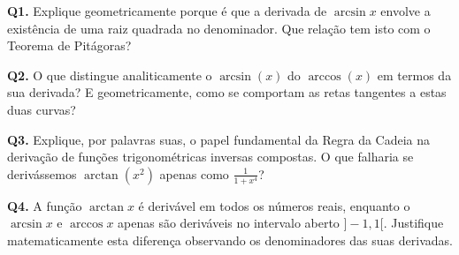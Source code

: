 \begin{oralbox}
  \textbf{Q1.} Explique geometricamente porque é que a derivada de $\arcsin x$ envolve a existência de uma raiz quadrada no denominador. Que relação tem isto com o Teorema de Pitágoras?
\end{oralbox}

\begin{oralbox}
  \textbf{Q2.} O que distingue analiticamente o $\arcsin(x)$ do $\arccos(x)$ em termos da sua derivada? E geometricamente, como se comportam as retas tangentes a estas duas curvas?
\end{oralbox}

\begin{oralbox}
  \textbf{Q3.} Explique, por palavras suas, o papel fundamental da Regra da Cadeia na derivação de funções trigonométricas inversas compostas. O que falharia se derivássemos $\arctan(x^2)$ apenas como $\frac{1}{1+x^4}$?
\end{oralbox}

\begin{oralbox}
  \textbf{Q4.} A função $\arctan x$ é derivável em todos os números reais, enquanto o $\arcsin x$ e $\arccos x$ apenas são deriváveis no intervalo aberto $]-1, 1[$. Justifique matematicamente esta diferença observando os denominadores das suas derivadas.
\end{oralbox}